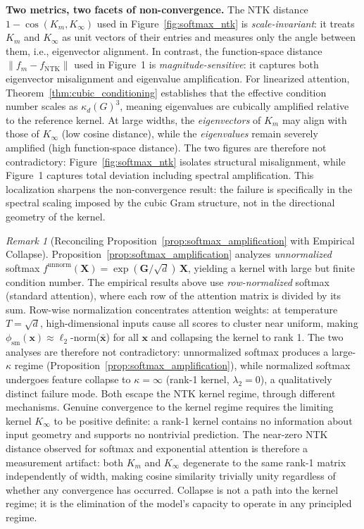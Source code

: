 \documentclass{article}
\theoremstyle{plain}
\theoremstyle{definition}
\theoremstyle{remark}
\newtheorem{remark}[theorem]{Remark}
\begin{document}
\textbf{Two metrics, two facets of non-convergence.} The NTK distance $1 - \cos(K_m, K_\infty)$ used in Figure~\ref{fig:softmax_ntk} is \emph{scale-invariant}: it treats $K_m$ and $K_\infty$ as unit vectors of their entries and measures only the angle between them, i.e., eigenvector alignment. In contrast, the function-space distance $\|f_m - f_{\mathrm{NTK}}\|$ used in Figure~1 is \emph{magnitude-sensitive}: it captures both eigenvector misalignment and eigenvalue amplification. For linearized attention, Theorem~\ref{thm:cubic_conditioning} establishes that the effective condition number scales as $\kappa_d(G)^3$, meaning eigenvalues are cubically amplified relative to the reference kernel. At large widths, the \emph{eigenvectors} of $K_m$ may align with those of $K_\infty$ (low cosine distance), while the \emph{eigenvalues} remain severely amplified (high function-space distance). The two figures are therefore not contradictory: Figure~\ref{fig:softmax_ntk} isolates structural misalignment, while Figure~1 captures total deviation including spectral amplification. This localization sharpens the non-convergence result: the failure is specifically in the spectral scaling imposed by the cubic Gram structure, not in the directional geometry of the kernel.

\begin{remark}[Reconciling Proposition~\ref{prop:softmax_amplification} with Empirical Collapse]
\label{rmk:softmax_reconcile}
Proposition~\ref{prop:softmax_amplification} analyzes \emph{unnormalized} softmax $f^{\mathrm{unnorm}}(\mathbf{X}) = \exp(\mathbf{G}/\sqrt{d})\,\mathbf{X}$, yielding a kernel with large but finite condition number. The empirical results above use \emph{row-normalized} softmax (standard attention), where each row of the attention matrix is divided by its sum. Row-wise normalization concentrates attention weights: at temperature $T = \sqrt{d}$, high-dimensional inputs cause all scores to cluster near uniform, making $\phi_{\mathrm{sm}}(\mathbf{x}) \approx \ell_2$-norm($\bar{\mathbf{x}}$) for all $\mathbf{x}$ and collapsing the kernel to rank 1. The two analyses are therefore not contradictory: unnormalized softmax produces a large-$\kappa$ regime (Proposition~\ref{prop:softmax_amplification}), while normalized softmax undergoes feature collapse to $\kappa = \infty$ (rank-1 kernel, $\lambda_2 = 0$), a qualitatively distinct failure mode. Both escape the NTK kernel regime, through different mechanisms. Genuine convergence to the kernel regime requires the limiting kernel $K_\infty$ to be positive definite: a rank-1 kernel contains no information about input geometry and supports no nontrivial prediction. The near-zero NTK distance observed for softmax and exponential attention is therefore a measurement artifact: both $K_m$ and $K_\infty$ degenerate to the same rank-1 matrix independently of width, making cosine similarity trivially unity regardless of whether any convergence has occurred. Collapse is not a path into the kernel regime; it is the elimination of the model's capacity to operate in any principled regime.
\end{remark}
\end{document}
